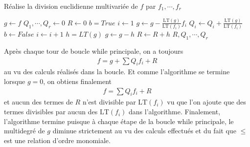             \begin{algorithm}
                \caption{Réalise la division euclidienne multivariée de $f$ par $f_1, \cdots, f_r$}
                \begin{algorithmic}
                        \State $g \gets f$
                        \State $Q_1, \cdots, Q_r \gets 0$
                        \State $R \gets 0$
                            \State $b = True$
                            \State $i \gets 1$
                                    \State $g \gets g - \frac{\mathrm{LT}(g)}{\mathrm{LT}(f_i)} f_i$
                                    \State $Q_i \gets Q_i + \frac{\mathrm{LT}(g)}{\mathrm{LT}(f_i)}$
                                    \State $b \gets False$
                                \EndIf
                                \State $i \gets i + 1$
                            \EndWhile
                                \State $h = LT(g)$
                                \State $g \leftarrow g - h$
                                \State $R \leftarrow R + h$
                            \EndIf
                        \EndWhile
                        \State \Return $R,Q_1, \cdots, Q_r$
                    \EndFunction
                \end{algorithmic}
            \end{algorithm}
            \begin{remq}
                Après chaque tour de boucle while principale, on a toujours 
                \begin{align*}
                    f = g + \sum Q_if_i + R
                \end{align*}
                au vu des calculs réalisés dans la boucle. Et comme l'algorithme se termine lorsque $g = 0$, on obtiens finalement 
                \begin{align*}
                    f = \sum Q_if_i + R
                \end{align*}
                et aucun des termes de $R$ n'est divisible par $\mathrm{LT}(f_i)$ vu que l'on ajoute que des termes divisibles par aucun des $\mathrm{LT}(f_i)$ dans l'algorithme. Finalement, l'algorithme termine puisque à chaque étape de la boucle while principale, le multidegré de $g$ diminue strictement au vu des calculs effectués et du fait que $\leq$ est une relation d'ordre monomiale.
            \end{remq}
